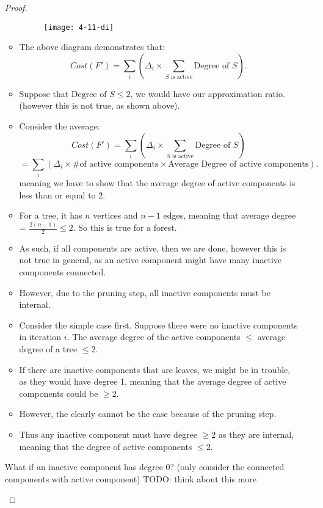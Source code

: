 \documentclass[../main/main.tex]{subfiles}
\begin{document}
\begin{itemize}
\begin{proof}
\begin{itemize}
\begin{figure}[h!]
				\centering
				\texttt{[image: 4-11-di]}
				\label{fig:4-11-di}
			\end{figure}
		\item The above diagram demonstrates that: \[
				Cost(F')=\sum_i\left( \Delta_i\times \sum_{S \text{ is active}}\text{Degree of $S$}\right) 
		.\] 
	\item Suppose that $\text{Degree of $S$}\le 2$, we would have our approximation ratio. (however this is not true, as shown above).
	\item Consider the average:\[
Cost(F')=\sum_i\left( \Delta_i\times \sum_{S \text{ is active}}\text{Degree of $S$}\right)\]\[
=\sum_i\left( \Delta_i\times \text{\# of active components} \times \text{Average Degree of active components}\right)
.\]  meaning we have to show that the average degree of active components is less than or equal to 2.
	\item For a tree, it has $n$ vertices and $n-1$ edges, meaning that average degree = $\frac{2(n-1)}{2}\le 2$. So this is true for a forest.
	\item As such, if all components are active, then we are done, however this is not true in general, as an active component might have many inactive components connected.
	\item However, due to the pruning step, all inactive components must be internal.
	\item Consider the simple case first. Suppose there were no inactive components in iteration $i$. The average degree of the active components $\le$ average degree of a tree $ \le 2$.
	\item If there are inactive components that are leaves, we might be in trouble, as they would have degree 1, meaning that the average degree of active components could be $\ge 2$.
	\item However, the clearly cannot be the case because of the pruning step.
	\item Thus any inactive component must have degree $\ge 2$ as they are internal, meaning that the degree of active components $\le 2$.
		\end{itemize}
		\begin{remark}
			What if an inactive component has degree 0? (only consider the connected components with active component) TODO: think about this more
		\end{remark}
	\end{proof}
\end{itemize}
\end{document}
